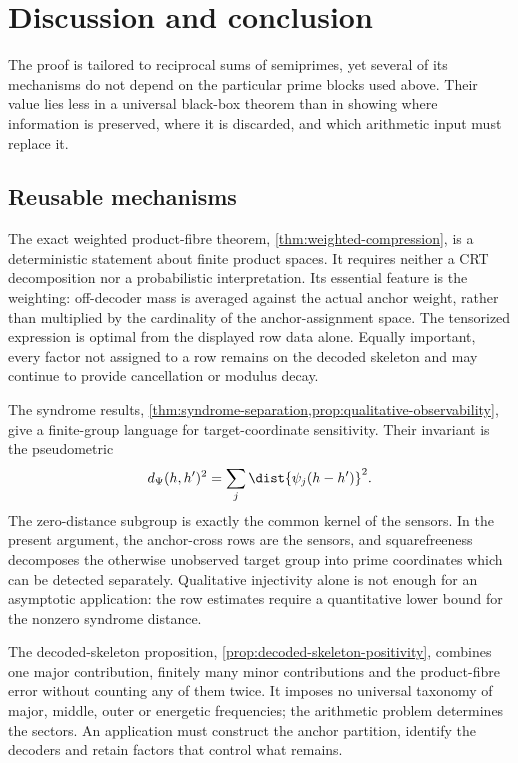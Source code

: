\section{Discussion and conclusion}
\label{sec:scope}

The proof is tailored to reciprocal sums of semiprimes, yet several of its mechanisms do not depend on the particular prime blocks used above.  Their value lies less in a universal black-box theorem than in showing where information is preserved, where it is discarded, and which arithmetic input must replace it.

\subsection{Reusable mechanisms}

The exact weighted product-fibre theorem, \cref{thm:weighted-compression}, is a deterministic statement about finite product spaces.  It requires neither a CRT decomposition nor a probabilistic interpretation.  Its essential feature is the weighting: off-decoder mass is averaged against the actual anchor weight, rather than multiplied by the cardinality of the anchor-assignment space.  The tensorized expression is optimal from the displayed row data alone.  Equally important, every factor not assigned to a row remains on the decoded skeleton and may continue to provide cancellation or modulus decay.

The syndrome results, \cref{thm:syndrome-separation,prop:qualitative-observability}, give a finite-group language for target-coordinate sensitivity.  Their invariant is the pseudometric
\[
 d_\Psi(h,h')^2
 =\sum_j\dist{\psi_j(h-h')}^2.
\]
The zero-distance subgroup is exactly the common kernel of the sensors.  In the present argument, the anchor-cross rows are the sensors, and squarefreeness decomposes the otherwise unobserved target group into prime coordinates which can be detected separately.  Qualitative injectivity alone is not enough for an asymptotic application: the row estimates require a quantitative lower bound for the nonzero syndrome distance.

The decoded-skeleton proposition, \cref{prop:decoded-skeleton-positivity}, combines one major contribution, finitely many minor contributions and the product-fibre error without counting any of them twice.  It imposes no universal taxonomy of major, middle, outer or energetic frequencies; the arithmetic problem determines the sectors.  An application must construct the anchor partition, identify the decoders and retain factors that control what remains.

